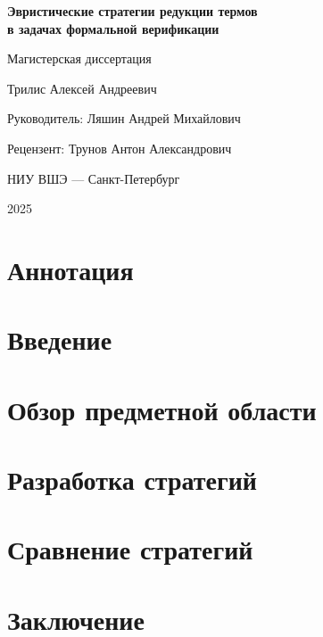 \documentclass{spbau-diploma}
\begin{document}
\renewcommand\listingscaption{Листинг}
\newenvironment{megaalgorithm}[1][htb]{
    \floatname{algorithm}{Стратегия}%
   \begin{algorithm}[H]
  }{\end{algorithm}}

%
\maketitle
{
\large \centering
\textbf{Эвристические стратегии редукции термов\\в задачах формальной верификации}
\bigskip
\bigskip

Магистерская диссертация
\bigskip
\bigskip

Трилис Алексей Андреевич
\bigskip
\bigskip

Руководитель: Ляшин Андрей Михайлович
\bigskip
\bigskip

Рецензент: Трунов Антон Александрович
\bigskip
\bigskip

НИУ ВШЭ --- Санкт-Петербург
\bigskip
\bigskip

2025

}
\tableofcontents


\section*{Аннотация}


\section*{Введение}


\section{Обзор предметной области}


\section{Разработка стратегий}


\section{Сравнение стратегий}


\section*{Заключение}





\end{document}
